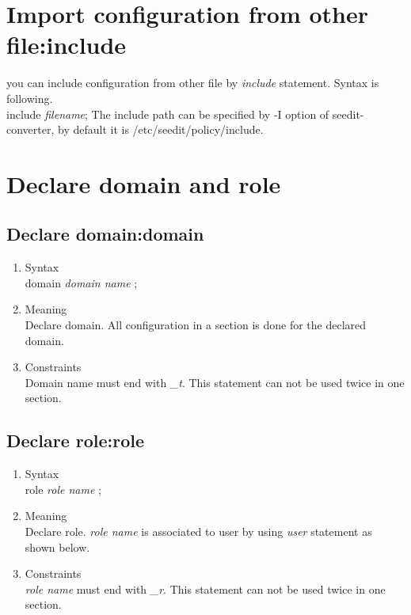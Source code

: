 \documentclass{article}
\begin{document}
\section{Import configuration from other file:include}
you can include configuration from other file by {\it include}
statement.
Syntax is following.\\
include {\it filename};
The include path can be specified by -I option of seedit-converter, by
default it is /etc/seedit/policy/include.


\section{Declare domain and role}
\subsection{Declare domain:domain}
\begin{enumerate}
 \item Syntax \\
      domain {\it domain name} ;
 \item Meaning\\
       Declare domain. All configuration in a section is done for
       the declared domain.
 \item Constraints\\
Domain name must end with {\it \_t}. This statement can not be used twice in one section. 
\end{enumerate}

\subsection{Declare role:role}
\begin{enumerate}
 \item Syntax\\
    role {\it  role name } ;
 \item Meaning\\
     Declare role.  {\it  role name } is associated to user by using
       {\it user} statement as shown below.
 \item Constraints\\
       {\it role name} must end with {\it \_r}. This statement can not be used twice in one section. 
\end{enumerate}
\end{document}
